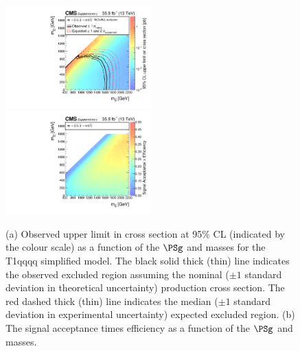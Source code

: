 \clearpage
\begin{figure}
    \begin{center}
            \includegraphics[width=0.50\textwidth]{Supplementary/T1qqqqXSEC}
            \includegraphics[width=0.50\textwidth]{Supplementary/T1qqqq_efficiency_aux}
        \caption{ (a) Observed upper limit in cross section at 95\% CL (indicated
        by the colour scale) as a function of 
        the $\PSg$ and \PSGczDo %
        masses for the 
        T1qqqq %
        simplified  model.  The  black  solid thick  (thin)  line indicates  the
        observed  excluded  region  assuming   the  nominal  (${\pm}1$  standard
        deviation in theoretical uncertainty)  production cross section. The red
        dashed  thick  (thin)  line  indicates  the  median  (${\pm}1$  standard
        deviation in experimental uncertainty) expected excluded region.
        (b) The signal acceptance times efficiency as a function of 
        the $\PSg$ and \PSGczDo %
        masses.
        }
        \label{fig:T1qqqq}
    \end{center}
\end{figure}


